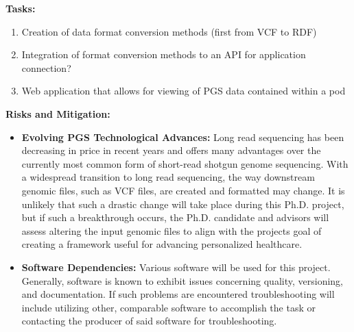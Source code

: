 \documentclass[11pt]{article}
\begin{document}
\textbf{Tasks:} 
\begin{enumerate}
	\item Creation of data format conversion methods (first from VCF to RDF)
	\item Integration of format conversion methods to an API for application connection?
	\item Web application that allows for viewing of PGS data contained within a pod
\end{enumerate}

\textbf{Risks and Mitigation:} 
\begin{itemize}
	\item \textbf{Evolving PGS Technological Advances:} 
	Long read sequencing has been decreasing in price in recent years and offers many advantages over the currently most common form of short-read shotgun genome sequencing. 
	With a widespread transition to long read sequencing, the way downstream genomic files, such as VCF files, are created and formatted may change. 
	It is unlikely that such a drastic change will take place during this Ph.D. project, but if such a breakthrough occurs, the Ph.D. candidate and advisors will assess altering the input genomic files to align with the project\textquotesingle s goal of creating a framework useful for advancing personalized healthcare.
	\item \textbf{Software Dependencies:} Various software will be used for this project. Generally, software is known to exhibit issues concerning quality, versioning, and documentation. 
	If such problems are encountered troubleshooting will include utilizing other, comparable software to accomplish the task or contacting the producer of said software for troubleshooting.
\end{itemize}
\end{document}
